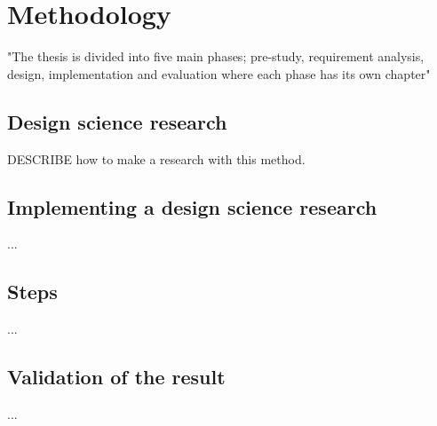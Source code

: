 \chapter{Methodology}

"The thesis is divided into five main phases; pre-study, requirement
analysis, design, implementation and evaluation where each phase has its own
chapter" %

\section{Design science research}

DESCRIBE how to make a research with this method.

\section{Implementing a design science research}

...

\section{Steps}

...

\section{Validation of the result}

...

